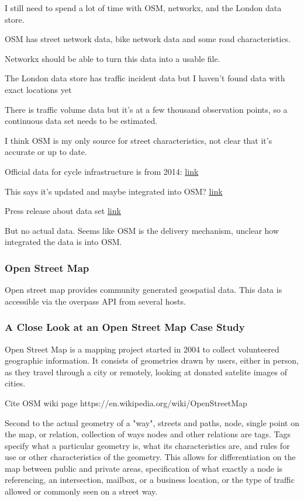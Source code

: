 \documentclass[11pt]{article} %
\begin{document}
I still need to spend a lot of time with OSM, networkx, and the London data store. 

OSM has street network data, bike network data and some road characteristics. 

Networkx should be able to turn this data into a usable file. 

The London data store has traffic incident data but I haven't found data with exact locations yet

There is traffic volume data but it's at a few thousand observation points, so a continuous data set needs to be estimated. 

I think OSM is my only source for street characteristics, not clear that it's accurate or up to date.


Official data for cycle infrastructure is from 2014: \href{https://data.gov.uk/dataset/47f0a282-3356-4530-8e7b-f67aaf4bec63/cycle-routes}{link}

This says it's updated and maybe integrated into OSM? \href{https://www.cyclestreets.net/blog/category/open-data/}{link}

Press release about data set \href{https://www.london.gov.uk/press-releases/mayoral/action-plan-to-get-more-londoners-cycling}{link}

But no actual data. Seems like OSM is the delivery mechanism, unclear how integrated the data is into OSM. 

\subsubsection{Open Street Map}

Open street map provides community generated geospatial data. This data is accessible via the overpass API from several hosts. 

\subsubsection{A Close Look at an Open Street Map Case Study}

Open Street Map is a mapping project started in 2004 to collect volunteered geographic information. It consists of geometries drawn by users, either in person, as they travel through a city or remotely, looking at donated satelite images of cities. 

Cite OSM wiki page
https://en.wikipedia.org/wiki/OpenStreetMap

Second to the actual geometry of a "way", streets and paths, node, single point on the map, or relation, collection of ways nodes and other relations are tags. Tags specify what a particular geometry is, what its characteristics are, and rules for use or other characteristics of the geometry. This allows for differentiation on the map between public and private areas, specification of what exactly a node is referencing, an intersection, mailbox, or a business location, or the type of traffic allowed or commonly seen on a street way. 
\end{document}
